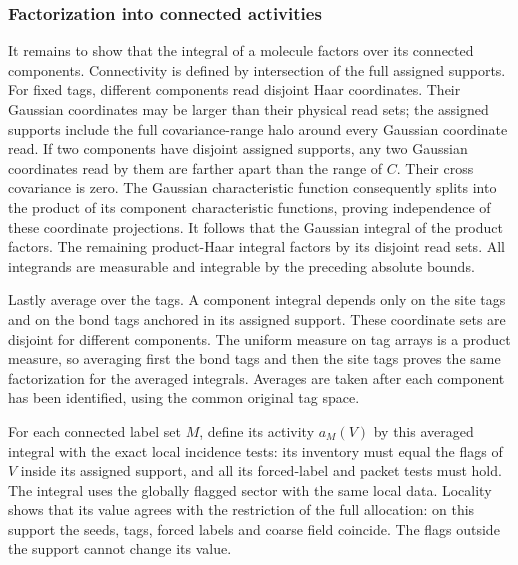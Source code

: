 \subsubsection{Factorization into connected activities}
It remains to show that the integral of a molecule factors over
its connected components. Connectivity is defined by intersection
of the full assigned supports. For fixed tags, different components
read disjoint Haar coordinates. Their Gaussian coordinates may be
larger than their physical read sets; the assigned supports include
the full covariance-range halo around every Gaussian coordinate read.
If two components have disjoint
assigned supports, any two Gaussian coordinates read by them are
farther apart than the range of $C$. Their cross covariance is zero.
The Gaussian characteristic function consequently splits into the
product of its component characteristic functions, proving independence
of these coordinate projections. It follows that the Gaussian integral
of the product factors. The remaining product-Haar integral factors
by its disjoint read sets. All integrands are measurable and integrable
by the preceding absolute bounds.

Lastly average over the tags. A component integral depends only on
the site tags and on the bond tags anchored in its assigned support.
These coordinate sets are disjoint for different components. The
uniform measure on tag arrays is a product measure, so averaging first
the bond tags and then the site tags proves the same factorization
for the averaged integrals. Averages are taken after each component
has been identified, using the common original tag space.

For each connected label set $M$, define its activity $a_M(V)$ by
this averaged integral with the exact local incidence tests: its
inventory must equal the flags of $V$ inside its assigned support,
and all its forced-label and packet tests must hold. The integral
uses the globally flagged sector with the same local data. Locality
shows that its value agrees with the restriction of the full
allocation: on this support the seeds, tags, forced labels and coarse
field coincide. The flags outside the support cannot change its value.

